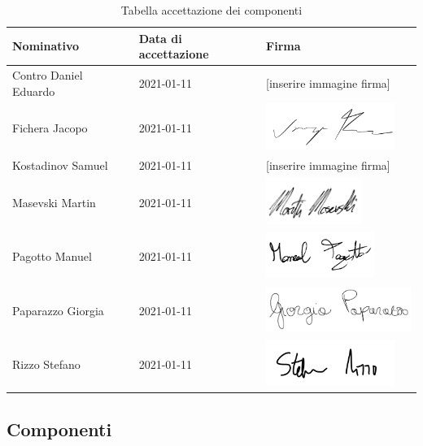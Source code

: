 \documentclass[../piano_di_progetto.tex]{subfiles}
\begin{document}
\begin{table}[!ht]
	\centering
	\begin{tabular}{|l|l|l|}
		\hline
		\rowcolor{lightgray}
		\textbf{Nominativo} & \textbf{Data di accettazione} & \textbf{Firma} \\ 
		\hline
		Contro Daniel Eduardo & 2021-01-11 & [inserire immagine firma] \\ 
		\hline
		Fichera Jacopo & 2021-01-11 & \includegraphics[height=1.5cm]{componenti/img/firma_jf} \\ 
		\hline
		Kostadinov Samuel & 2021-01-11 & [inserire immagine firma] \\
		\hline
		Masevski Martin & 2021-01-11 & \includegraphics[height=1.5cm]{componenti/img/firma_mm} \\ 
		\hline
		Pagotto Manuel & 2021-01-11 & \includegraphics[height=1.5cm]{componenti/img/firma_mp}  \\ 
		\hline
		Paparazzo Giorgia & 2021-01-11 & \includegraphics[height=1.5cm]{componenti/img/firma_gp} \\
		\hline
		Rizzo Stefano & 2021-01-11 & \includegraphics[height=1.5cm]{componenti/img/firma_sr}  \\ 
		\hline

	\end{tabular}
		\caption{Tabella accettazione dei componenti}
\end{table}

\subsection{Componenti}%
\label{sub:comp}
\end{document}
